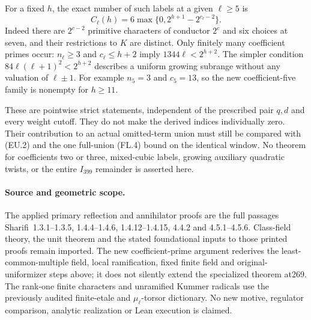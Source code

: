 For a fixed $h$, the exact number of such labels at a given
$\ell\geq5$ is
\[
               C_\ell(h)=6\max\{0,2^{h+1}-2^{c_\ell-2}\}.
 \tag{G175.25}
\]
Indeed there are $2^{c-2}$ primitive characters of conductor
$2^c$ and six choices at seven, and their restrictions to $K$
are distinct.  Only finitely many coefficient primes occur:
$n_\ell\geq3$ and $c_\ell\leq h+2$ imply
$1344\ell<2^{h+2}$.
The simpler condition $84\ell(\ell+1)^2<2^{h+2}$ describes
a uniform growing subrange without any valuation of $\ell\pm1$.
For example $n_5=3$ and $c_5=13$, so the new coefficient-five
family is nonempty for $h\geq11$.

These are pointwise strict statements, independent of the prescribed
pair $q,d$ and every weight cutoff.  They do not make the derived
indices individually zero.  Their contribution to an actual
omitted-term union must still be compared with (EU.2) and the one
full-union (FL.4) bound on the identical window.
No theorem for coefficients two or three, mixed-cubic labels,
growing auxiliary quadratic twists, or the entire $I_{399}$
remainder is asserted here.

\paragraph{Source and geometric scope.}
The applied primary reflection and annihilator proofs are the full
passages Sharifi~1.3.1--1.3.5, 1.4.4--1.4.6,
1.4.12--1.4.15, 4.4.2 and 4.5.1--4.5.6.
Class-field theory, the unit theorem and the stated foundational
inputs to those printed proofs remain imported.
The new coefficient-prime argument rederives the least-common-multiple
field, local ramification, fixed finite field and original-uniformizer
steps above; it does not silently extend the specialized theorem at269.
The rank-one finite characters and unramified Kummer radicals use the
previously audited finite-etale and $\mu_\ell$-torsor dictionary.
No new motive, regulator comparison, analytic realization or
Lean execution is claimed.
